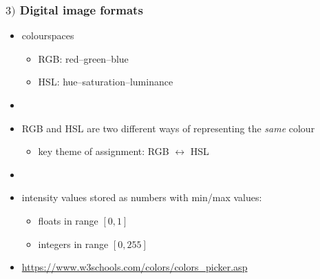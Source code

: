 \documentclass[english,14pt]{beamer}
\begin{document}
\begin{frame}[fragile]

\frametitle{$3)$ Digital image formats}

\begin{itemize}

	\item colourspaces
	\begin{itemize}
		\item RGB: red--green--blue
		\item HSL: hue--saturation--luminance
	\end{itemize}
	\item[]
	\item RGB and HSL are two different ways of representing the \emph{same} colour
	\begin{itemize}
		\item key theme of assignment: RGB $\longleftrightarrow$ HSL
	\end{itemize}
	\item[]
	\item intensity values stored as numbers with min/max values:
	\begin{itemize}
		\item floats in range $[0,1]$
		\item integers in range $[0,255]$
	\end{itemize}
	\item {\small \href{https://www.w3schools.com/colors/colors_picker.asp}{https://www.w3schools.com/colors/colors\_picker.asp}}
\end{itemize}

\end{frame}

\end{document}
